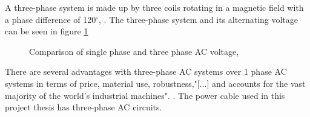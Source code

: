 \noindent A three-phase system is made up by three coils rotating in a magnetic field with a phase difference of 120$^{\circ}$, \cite{Dale2000}. The three-phase system and its alternating voltage can be seen in figure \ref{fig:volt} 

\begin{figure}[H]
\hfill
{}\hfill
\caption[$\; \:$Comparison of single phase and three phase AC voltage]{Comparison of single phase and three phase AC voltage, \cite{Dale2000}}
\label{fig:volt}
\end{figure}

\noindent There are several advantages with three-phase AC systems over 1 phase AC systems in terms of price, material use, robustness,"[...] and accounts for the vast majority of the world's industrial machines". \cite{1995Tac}. The power cable used in this project thesis has three-phase AC circuits. 
 


